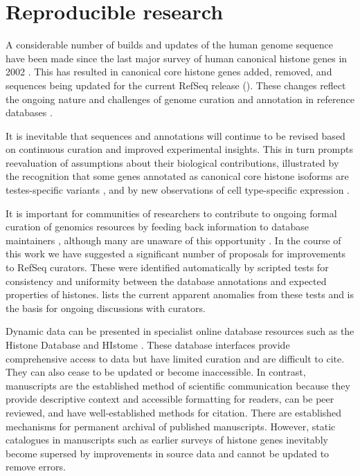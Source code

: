 \section{Reproducible research}

  A considerable number of builds and updates of the human genome sequence have been made
  since the last major survey of human canonical histone genes in 2002 \citep{Marzluff02}.
  This has resulted in
  \AddedSinceReference{} canonical core histone genes added,
  \RemovedSinceReference{} removed,
  and \SequencesUpdatedSinceReference{} sequences
  being updated for the current RefSeq release ().
  These changes reflect the ongoing nature and challenges of
  genome curation and annotation in reference databases \citep{BorkKoonin1998}.

  It is inevitable that sequences and annotations will continue to be revised
  based on continuous curation and improved experimental insights.
  This in turn prompts reevaluation of assumptions about their biological contributions,
  illustrated by the recognition that some genes
  annotated as canonical core histone isoforms are testes-specific variants \citep{Talbert2012},
  and by new observations of cell type-specific expression \citep{Molden2015}.

  It is important for communities of researchers to contribute
  to ongoing formal curation of genomics resources
  by feeding back information to database maintainers \citep{SteinNRG2001},
  although many are unaware of this opportunity \citep{HollidaySPR2015}.
  In the course of this work we have suggested a significant number of proposals
  for improvements to RefSeq curators.
  These were identified automatically by scripted tests for consistency and uniformity
  between the database annotations and expected properties of histones.
   lists the current apparent anomalies from these tests
  and is the basis for ongoing discussions with curators.

  Dynamic data can be presented in specialist online database resources
  such as the Histone Database \citep{HistoneDB2016} and HIstome \citep{HIstome2012}.
  These database interfaces provide comprehensive access to data
  but have limited curation and are difficult to cite.
  They can also cease to be updated or become inaccessible.
  In contrast, manuscripts are the established method of scientific communication
  because they provide descriptive context and accessible formatting for readers,
  can be peer reviewed, and have well-established methods for citation.
  There are established mechanisms for permanent archival of published manuscripts.
  However, static catalogues in manuscripts
  such as earlier surveys of histone genes \citep{AlbigHumangen1997,Marzluff02}
  inevitably become supersed by improvements in source data and cannot be updated to remove errors.

